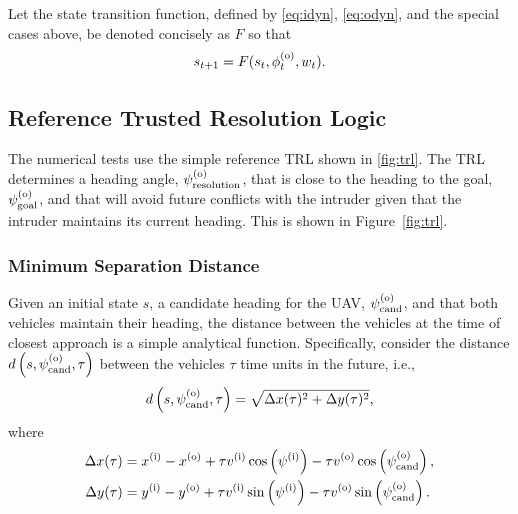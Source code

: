 Let the state transition function, defined by \eqref{eq:idyn}, \eqref{eq:odyn}, and the special cases above, be denoted concisely as $F$ so that  
\begin{equation}\label{eq:sys_dyn}
    s_{t+1} = F(s_t, \phi^{(\mathrm{o})}_t, w_t) \text{.}
\end{equation}


\subsection{Reference Trusted Resolution Logic}\label{sec:trl}

The numerical tests use the simple reference TRL shown in \cref{fig:trl}.
The TRL determines a heading angle, $\psi^{(\mathrm{o})}_\mathrm{resolution}$, that is close to the heading to the goal, $\psi^{(\mathrm{o})}_\mathrm{goal}$, and that will avoid future conflicts with the intruder given that the intruder maintains its current heading. This is shown in Figure~\ref{fig:trl}.

\subsubsection{Minimum Separation Distance}

Given an initial state $s$, a candidate heading for the UAV, $\psi^{(\mathrm{o})}_{\mathrm{cand}}$, and that both vehicles maintain their heading, the distance between the vehicles at the time of closest approach is a simple analytical function. Specifically, consider the distance  $d\left(s,\psi^{(\mathrm{o})}_{\mathrm{cand}},\tau\right)$ between the vehicles $\tau$ time units in the future, i.e., 
\begin{equation} \label{eqn:dist}
    d\left(s, \psi^{(\mathrm{o})}_{\mathrm{cand}}, \tau\right) = \sqrt{\Delta x(\tau)^2 + \Delta y(\tau)^2} \text{,}
\end{equation}
where
\begin{align*}
    \Delta x(\tau) &= x^{(\mathrm{i})} - x^{(\mathrm{o})} + \tau v^{(\mathrm{i})} \cos\left(\psi^{(\mathrm{i})}\right) - \tau v^{(\mathrm{o})} \cos\left(\psi^{(\mathrm{o})}_{\mathrm{cand}}\right),\\
    \Delta y(\tau) &= y^{(\mathrm{i})} - y^{(\mathrm{o})} + \tau v^{(\mathrm{i})} \sin\left(\psi^{(\mathrm{i})}\right) - \tau v^{(\mathrm{o})} \sin\left(\psi^{(\mathrm{o})}_{\mathrm{cand}}\right) \text{.}
\end{align*}

